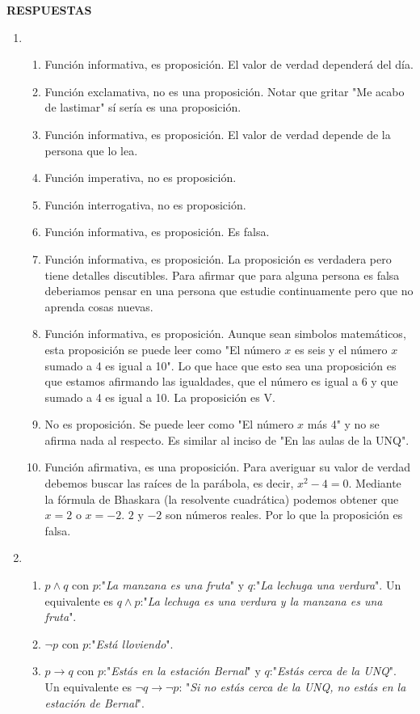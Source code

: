 \documentclass[a4paper]{article}
\newcommand{\exercise}{\item}
\newcommand{\then}{\to}
\begin{document}
 \textbf{RESPUESTAS}\begin{enumerate}\exercise\begin{enumerate} [label=(\alph*)]		\item Función informativa, es proposición. El valor de verdad dependerá del día.
		\item Función exclamativa, no es una proposición. Notar que gritar "Me acabo de lastimar" sí sería es una proposición.
		\item Función informativa, es proposición. El valor de verdad depende de la persona que lo lea.
		\item Función imperativa, no es proposición.
		\item Función interrogativa, no es proposición.
		\item Función informativa, es proposición. Es falsa.
		\item Función informativa, es proposición. La proposición es verdadera pero tiene detalles discutibles. Para afirmar que para alguna persona es falsa deberiamos pensar en una persona que estudie continuamente pero que no aprenda cosas nuevas.
		\item Función informativa, es proposición. Aunque sean simbolos matemáticos, esta proposición se puede leer como "El número $x$ es seis y el número $x$ sumado a 4 es igual a 10". Lo que hace que esto sea una proposición es que estamos afirmando las igualdades, que el número es igual a 6 y que sumado a 4 es igual a 10. La proposición es V.
		\item No es proposición. Se puede leer como "El número $x$ más 4" y no se afirma nada al respecto. Es similar al inciso de "En las aulas de la UNQ".
		\item Función afirmativa, es una proposición. Para averiguar su valor de verdad debemos buscar las raíces de la parábola, es decir, $x^2-4=0$. Mediante la fórmula de Bhaskara (la resolvente cuadrática) podemos obtener que $x=2$ o $x=-2$. $2$ y $-2$ son números reales. Por lo que la proposición es falsa. 
\end{enumerate}\exercise\begin{enumerate} [label=(\alph*)]		\item $p \land q$ con $p$:"\textit{La manzana es una fruta}" y $q$:"\textit{La lechuga una verdura}". Un equivalente es $q \land p$:"\textit{La lechuga es una verdura y la manzana es una fruta}".
		\item $\neg p$ con $p$:"\textit{Está lloviendo}".
		\item $p\then q$ con $p$:"\textit{Estás en la estación Bernal}" y $q$:"\textit{Estás cerca de la UNQ}". Un equivalente es $\neg q \then \neg p$: "\textit{Si no estás cerca de la UNQ, no estás en la estación de Bernal}".

\end{enumerate}
\end{enumerate}
\end{document}
